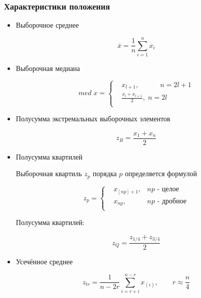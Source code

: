\documentclass[12pt]{article}
\begin{document}
\subsubsection{Характеристики положения}
\begin{itemize}
	\item Выборочное среднее
	
	\begin{equation}
		\overline{x} = \frac{1}{n} \sum_{i=1}^{n}x_{i}
		\label{mean}
	\end{equation}
		
	\item Выборочная медиана
	
	\begin{equation}
		med \; x = 
		\left\{
		\begin{aligned}
			& x_{l + 1}, \qquad \quad n = 2l + 1\\
			& \frac{x_{l} + x_{l + 1}}{2}, \; n = 2l\\
		\end{aligned}
		\right.
		\label{med}
	\end{equation}

	\item Полусумма экстремальных выборочных элементов
	
	\begin{equation}
		z_R = \frac{x_{1} + x_{n}}{2}
		\label{extreme}
	\end{equation}

	\item Полусумма квартилей
	
	Выборочная квартиль $z_p$ порядка $p$ определяется формулой

	$$
	z_p = 
	\left\{
	\begin{aligned}
		& x_{[np] + 1}, & np\text{ - целое}\\
		& x_{np}, \; & np\text{ - дробное}\\
	\end{aligned}
	\right.
	$$

	Полусумма квартилей:

	\begin{equation}
		z_Q = \frac{z_{1/4} + z_{3/4}}{2}
		\label{quart}
	\end{equation}

	\item Усечённое среднее
	
	\begin{equation}
		z_{tr} = \frac{1}{n - 2r} \sum_{i=r+i}^{n - r}x_{(i)}, \qquad r \approx \frac{n}{4}  
		\label{trunc}
	\end{equation}

\end{itemize}
\end{document}
